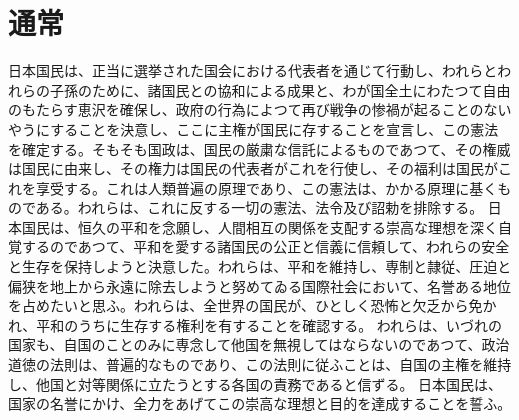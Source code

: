 \documentclass[dvipdfmx]{jsarticle}
\begin{document}
\section*{通常}
日本国民は、正当に選挙された国会における代表者を通じて行動し、われらとわれらの子孫のために、諸国民との協和による成果と、わが国全土にわたつて自由のもたらす恵沢を確保し、政府の行為によつて再び戦争の惨禍が起ることのないやうにすることを決意し、ここに主権が国民に存することを宣言し、この憲法を確定する。そもそも国政は、国民の厳粛な信託によるものであつて、その権威は国民に由来し、その権力は国民の代表者がこれを行使し、その福利は国民がこれを享受する。これは人類普遍の原理であり、この憲法は、かかる原理に基くものである。われらは、これに反する一切の憲法、法令及び詔勅を排除する。
日本国民は、恒久の平和を念願し、人間相互の関係を支配する崇高な理想を深く自覚するのであつて、平和を愛する諸国民の公正と信義に信頼して、われらの安全と生存を保持しようと決意した。われらは、平和を維持し、専制と隷従、圧迫と偏狭を地上から永遠に除去しようと努めてゐる国際社会において、名誉ある地位を占めたいと思ふ。われらは、全世界の国民が、ひとしく恐怖と欠乏から免かれ、平和のうちに生存する権利を有することを確認する。
われらは、いづれの国家も、自国のことのみに専念して他国を無視してはならないのであつて、政治道徳の法則は、普遍的なものであり、この法則に従ふことは、自国の主権を維持し、他国と対等関係に立たうとする各国の責務であると信ずる。
日本国民は、国家の名誉にかけ、全力をあげてこの崇高な理想と目的を達成することを誓ふ。
\end{document}
